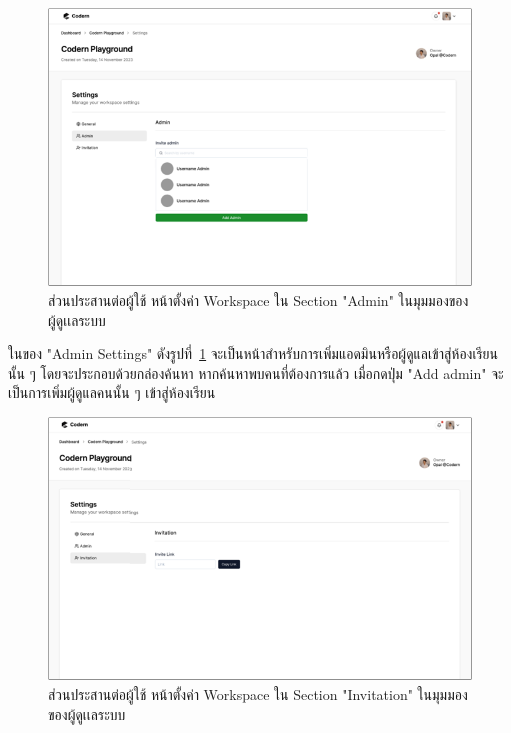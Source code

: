 \documentclass[12pt,one side,openright,a4paper]{cpe-thesis-th}
\newcommand{\thaijustify}[1]{%
  \par\hspace{30pt}\justifying
  #1
}
\begin{document}
\hypertarget{ui-assign-settings2}{
  \begin{figure}[H]
    \centering
    \includegraphics[width=15cm]{figure/ui/ui-assign-settings2.png}
    \caption[ส่วนประสานต่อผู้ใช้ หน้าตั้งค่า Workspace ใน Section "Admin" ในมุมมองของผู้ดูเเลระบบ]{ส่วนประสานต่อผู้ใช้ หน้าตั้งค่า Workspace ใน Section "Admin" ในมุมมองของผู้ดูเเลระบบ}
    \label{fig:ui-assign-settings2}
  \end{figure}
}
\thaijustify{
  ในของ "Admin Settings" ดังรูปที่~\ref{fig:ui-assign-settings2} จะเป็นหน้าสำหรับการเพิ่มแอดมินหรือผู้ดูแลเข้าสู่ห้องเรียนนั้น ๆ โดยจะประกอบด้วยกล่องค้นหา หากค้นหาพบคนที่ต้องการแล้ว เมื่อกดปุ่ม "Add admin" จะเป็นการเพิ่มผู้ดูแลคนนั้น ๆ เข้าสู่ห้องเรียน
}
\hypertarget{ui-assign-settings3}{
  \begin{figure}[H]
    \centering
    \includegraphics[width=15cm]{figure/ui/ui-assign-settings3.png}
    \caption[ ส่วนประสานต่อผู้ใช้ หน้าตั้งค่า Workspace ใน Section "Invitation" ในมุมมองของผู้ดูเเลระบบ]{ ส่วนประสานต่อผู้ใช้ หน้าตั้งค่า Workspace ใน Section "Invitation" ในมุมมองของผู้ดูเเลระบบ}
    \label{fig:ui-assign-settings3}
  \end{figure}
}
\end{document}
